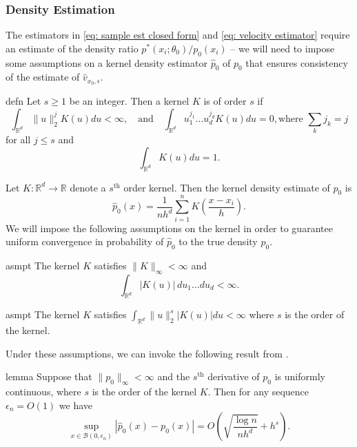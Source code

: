 \documentclass[11pt]{article}
\begin{document}
\subsubsection{Density Estimation}
The estimators in \cref{eq: sample est closed form} and \cref{eq: velocity estimator} require an estimate of the density ratio $p^*(x_i;\theta_0)/p_0(x_i)$ -- we will need to impose some assumptions on a kernel density estimator $\hat{p}_0$ of $p_0$ that ensures consistency of the estimate of $\hat{v}_{x_0, \epsilon}$. 

\begin{restatable}{defn}{}
    Let $s \geq 1$ be an integer. Then a kernel $K$ is of order $s$ if 
    \[\int_{\mathbb{R}^d}\|u\|_2^jK(u)du < \infty, \quad \text{and}\quad \int_{\mathbb{R}^d}u_1^{j_1}\dots u_d^{j_d}K(u) du = 0, \text{where } \sum_kj_k = j\]
    for all $j \leq s$ and 
    \[\int_{\mathbb{R}^d}K(u)du = 1.\]
\end{restatable}

Let $K:\mathbb{R}^d \rightarrow \mathbb{R}$ denote a $s^{\text{th}}$ order kernel. Then the kernel density estimate of $p_0$ is
\begin{equation}
    \hat{p}_0(x) = \frac{1}{nh^d}\sum_{i = 1}^nK\left(\frac{x -x_i}{h}\right). \label{eq: kde}
\end{equation}
We will impose the following assumptions on the kernel in order to guarantee uniform convergence in probability of $\hat{p}_0$ to the true density $p_0$.


\begin{restatable}{asmpt}{} \label{assumption: boundedness and integrability}
    The kernel $K$ satisfies $\|K\|_{\infty} < \infty$ and 
    \[\int_{\mathbb{R}^d}|K(u)|\,du_1\dots du_d < \infty.\]
\end{restatable}

\begin{restatable}{asmpt}{} \label{assumption: kernel smoothness}
    The kernel $K$ satisfies $\int_{\mathbb{R}^d}\|u\|_2^s|K(u)|du  < \infty$ where $s$ is the order of the kernel. 
\end{restatable}
Under these assumptions, we can invoke the following result from \citet{hansen2008uniform}.
\begin{restatable}{lemma}{} \label{lemma: uniform convergence of kde}
    Suppose that $\|p_0\|_{\infty}< \infty$ and the $s^{\text{th}}$ derivative of $p_0$ is uniformly continuous, where $s$ is the order of the kernel $K$. Then for any sequence $\epsilon_n  = O(1)$ we have
    \[\sup_{x \in \mathcal{B}(0, \epsilon_n)}\left|\hat{p}_0(x) - p_0(x)\right| = O\left(\sqrt{\frac{\log n}{nh^d}} +h^s \right).\]
\end{restatable}
\end{document}
